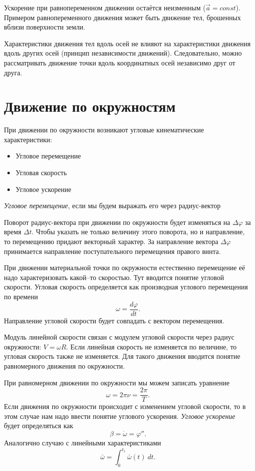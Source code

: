 \documentclass[10pt]{scrbook}
\begin{document}
Ускорение при равнопеременном движении остаётся неизменным  (\( \vec{a} = const
\)). Примером равнопеременного движения может быть движение тел, брошенных
вблизи поверхности земли.

Характеристики движения тел вдоль осей не влияют на характеристики движения
вдоль других осей (принцип независимости движений). Следовательно, можно
рассматривать движение точки вдоль координатных осей независимо друг от друга.

\section{Движение по окружностям}

При движении по окружности возникают угловые кинематические характеристики:
\begin{itemize}
	\item Угловое перемещение
	\item Угловая скорость
	\item Угловое ускорение
\end{itemize}

\emph{Угловое перемещение}, если мы будем выражать его через радиус-вектор

Поворот радиус-вектора при движении по окружности будет изменяться на \( \Delta
\varphi \) за время \( \Delta t \). Чтобы указать не только величину этого
поворота, но и направление, то перемещению придают векторный характер. За
направление вектора \( \Delta \varphi \) принимается направление
поступательного перемещения правого винта.

При движении материальной точки по окружности естественно перемещение её надо
характеризовать какой--то скоростью. Тут вводится понятие угловой скорости.
Угловая скорость определяется как производная углового перемещения по времени
\[ \omega = \frac{d \varphi}{d t} .\] Направление угловой скорости будет
совпадать с вектором перемещения.

Модуль линейной скорости связан с модулем угловой скорости через радиус
окружности: \( V = \omega R \). Если линейная скорость не изменяется по величине, то
угловая скорость также не изменяется. Для такого движения вводится понятие
равномерного движения по окружности.

При равномерном движении по окружности мы можем записать уравнение \[
	\omega = 2 \pi \nu = \frac{2 \pi}{T}
	.\] Если движения по окружности происходит с изменением угловой скорости, то
в этом случае нам надо ввести понятие углового ускорения. \emph{Угловое
	ускорение} будет определяться как \[
	\beta = \dot{\omega} = \varphi''
	.\] Аналогично случаю с линейными характеристиками \[
	\bar{\omega} = \int_{{0}}^{{t_1}} {\bar{\omega} (t)} \: d{t} {}
	.\]
\end{document}

